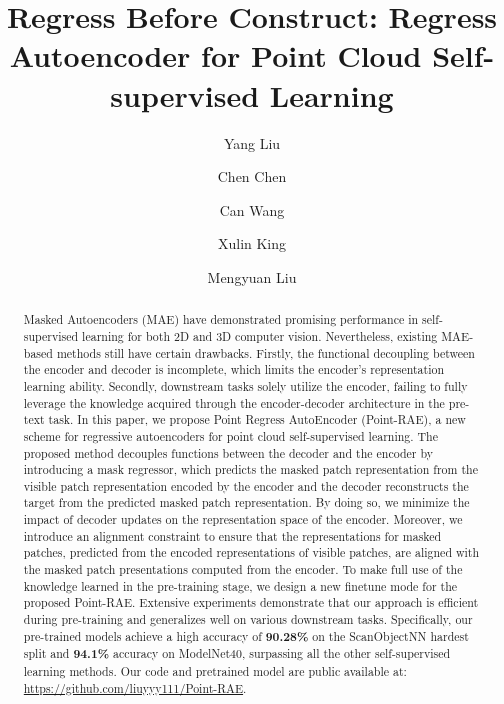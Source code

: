 \documentclass[sigconf, screen]{acmart}
\begin{document}
\title[Regress Before Construct]{Regress Before Construct: Regress Autoencoder for Point Cloud Self-supervised Learning}


\author{Yang Liu}


\author{Chen Chen}


\author{Can Wang}
\author{Xulin King}
\author{Mengyuan Liu}
\renewcommand{\shortauthors}{Yang Liu, Chen Chen, Can Wang, Xulin King, \& Mengyuan Liu}


\begin{abstract}
Masked Autoencoders (MAE) have demonstrated promising performance in self-supervised learning for both 2D and 3D computer vision. Nevertheless, existing MAE-based methods still have certain drawbacks. Firstly, the functional decoupling between the encoder and decoder is incomplete, which limits the encoder's representation learning ability. Secondly, downstream tasks solely utilize the encoder, failing to fully leverage the knowledge acquired through the encoder-decoder architecture in the pre-text task.
In this paper, we propose Point Regress AutoEncoder (Point-RAE), a new scheme for regressive autoencoders for point cloud self-supervised learning. 
The proposed method decouples functions between the decoder and the encoder by introducing a mask regressor, which predicts the masked patch representation from the visible patch representation encoded by the encoder and the decoder reconstructs the target from the predicted masked patch representation.
By doing so, we minimize the impact of decoder updates on the representation space of the encoder.
Moreover, we introduce an alignment constraint to ensure that the representations for masked patches, predicted from the encoded representations of visible patches, are aligned with the masked patch presentations computed from the encoder.
To make full use of the knowledge learned in the pre-training stage, we design a new finetune mode for the proposed Point-RAE. Extensive experiments demonstrate that our approach is efficient during pre-training and generalizes well on various downstream tasks. Specifically, our pre-trained models achieve a high accuracy of \textbf{90.28\%} on the ScanObjectNN hardest split and \textbf{94.1\%} accuracy on ModelNet40, surpassing all the other self-supervised learning methods. 
Our code and pretrained model are public available at:  \url{https://github.com/liuyyy111/Point-RAE}.
\end{abstract}
\end{document}
